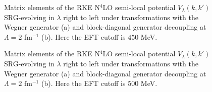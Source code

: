 \documentclass[preprintnumbers,floatfix,aps,prc,preprint,nofootinbib]{revtex4-1}
\begin{document}

\begin{figure}[H]
	\centering
	
	\caption{Matrix elements of the RKE N$^4$LO semi-local potential $V_{\lambda}(k, k')$ SRG-evolving in $\lambda$ right to left under transformations with the Wegner generator (a) and block-diagonal generator decoupling at $\Lambda=2$ fm$^{-1}$ (b). Here the EFT cutoff is $450$ MeV.}
	\label{potential_contours_kvnn111_3S1}
\end{figure}

\begin{figure}[H]
	\centering
	
	\caption{Matrix elements of the RKE N$^4$LO semi-local potential $V_{\lambda}(k, k')$ SRG-evolving in $\lambda$ right to left under transformations with the Wegner generator (a) and block-diagonal generator decoupling at $\Lambda=2$ fm$^{-1}$ (b). Here the EFT cutoff is $500$ MeV.}
	\label{potential_contours_kvnn112_3S1}
\end{figure}
\end{document}
